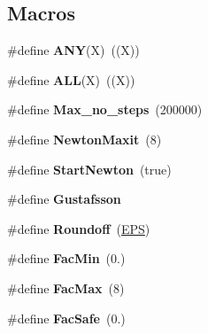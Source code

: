 \subsection*{Macros}
\begin{DoxyCompactItemize}
\item 
\#define {\bfseries A\+NY}(X)~((X))\hypertarget{radau2a_8cu_a1fb079c51babe820cd76885d3c519446}{}\label{radau2a_8cu_a1fb079c51babe820cd76885d3c519446}

\item 
\#define {\bfseries A\+LL}(X)~((X))\hypertarget{radau2a_8cu_ada568356af1dada57942e4b6e5d271b0}{}\label{radau2a_8cu_ada568356af1dada57942e4b6e5d271b0}

\item 
\#define {\bfseries Max\+\_\+no\+\_\+steps}~(200000)\hypertarget{radau2a_8cu_a4f5652e996f678da1b1b93c8aa4a7961}{}\label{radau2a_8cu_a4f5652e996f678da1b1b93c8aa4a7961}

\item 
\#define {\bfseries Newton\+Maxit}~(8)\hypertarget{radau2a_8cu_ab408861ee5149b85ac129cb8a3875743}{}\label{radau2a_8cu_ab408861ee5149b85ac129cb8a3875743}

\item 
\#define {\bfseries Start\+Newton}~(true)\hypertarget{radau2a_8cu_aa9c48bc3c2002ed4e6792dd7f526d783}{}\label{radau2a_8cu_aa9c48bc3c2002ed4e6792dd7f526d783}

\item 
\#define {\bfseries Gustafsson}\hypertarget{radau2a_8cu_a619cdc11d911799dd674458eb84dc349}{}\label{radau2a_8cu_a619cdc11d911799dd674458eb84dc349}

\item 
\#define {\bfseries Roundoff}~(\hyperlink{solver__options_8h_a6ebf6899d6c1c8b7b9d09be872c05aae}{E\+PS})\hypertarget{radau2a_8cu_a0628e9521e9961c49b173765f9d815d3}{}\label{radau2a_8cu_a0628e9521e9961c49b173765f9d815d3}

\item 
\#define {\bfseries Fac\+Min}~(0.)\hypertarget{radau2a_8cu_a2709085ffea146cba50846d860f7d945}{}\label{radau2a_8cu_a2709085ffea146cba50846d860f7d945}

\item 
\#define {\bfseries Fac\+Max}~(8)\hypertarget{radau2a_8cu_a3ae724566d10e7ae2a48e1d340d6937b}{}\label{radau2a_8cu_a3ae724566d10e7ae2a48e1d340d6937b}

\item 
\#define {\bfseries Fac\+Safe}~(0.)\hypertarget{radau2a_8cu_a29559e0d6fcf09d76688dbc471b01219}{}\label{radau2a_8cu_a29559e0d6fcf09d76688dbc471b01219}


\end{DoxyCompactItemize}
